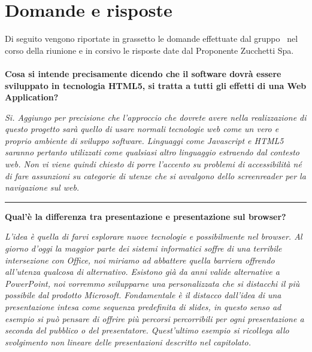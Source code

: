 \newenvironment{margini}[2]
{
	\begin{list}{} {
			\setlength{\leftmargin}{#1}
			\setlength{\rightmargin}{#2}
		} \item }
	{\end{list}}

\section{Domande e risposte}
Di seguito vengono riportate in grassetto le domande effettuate dal gruppo \gruppo\ nel corso della riunione e in corsivo le risposte date dal Proponente Zucchetti Spa.\\
\\\textbf{Cosa si intende precisamente dicendo che il software dovrà essere sviluppato in tecnologia HTML5, si tratta a tutti gli effetti di una Web Application?}\\
\begin{margini}{0.7cm}{0.7cm}
\textit{Si.  Aggiungo per  precisione che l'approccio che dovrete avere nella realizzazione di questo progetto sarà quello di usare normali tecnologie web come un vero e proprio ambiente di sviluppo software. Linguaggi come Javascript e HTML5 saranno pertanto utilizzati come qualsiasi altro linguaggio estraendo dal contesto web. Non vi viene quindi chiesto di porre l'accento su problemi di accessibilità né di fare assunzioni su categorie di utenze che si avvalgono dello screenreader per la navigazione sul web.}\\
\end{margini}
\hrule
\bigskip
\textbf{Qual'è la differenza tra presentazione e presentazione sul browser?}\\
\begin{margini}{0.7cm}{0.7cm}
	\textit{L'idea è quella di farvi esplorare nuove tecnologie e possibilmente nel browser. Al giorno d'oggi la maggior parte dei sistemi informatici soffre di una terribile intersezione con Office, noi miriamo ad abbattere quella barriera offrendo all'utenza qualcosa di alternativo. Esistono già da anni valide alternative a PowerPoint, noi vorremmo svilupparne una personalizzata che si distacchi il più possibile dal prodotto Microsoft. Fondamentale è il distacco dall'idea di una presentazione intesa come sequenza predefinita di slides, in questo senso ad esempio si può pensare di offrire più percorsi percorribili per ogni presentazione a seconda del pubblico o del presentatore. Quest'ultimo esempio si ricollega allo svolgimento non lineare delle presentazioni descritto nel capitolato.}\\
\end{margini}
